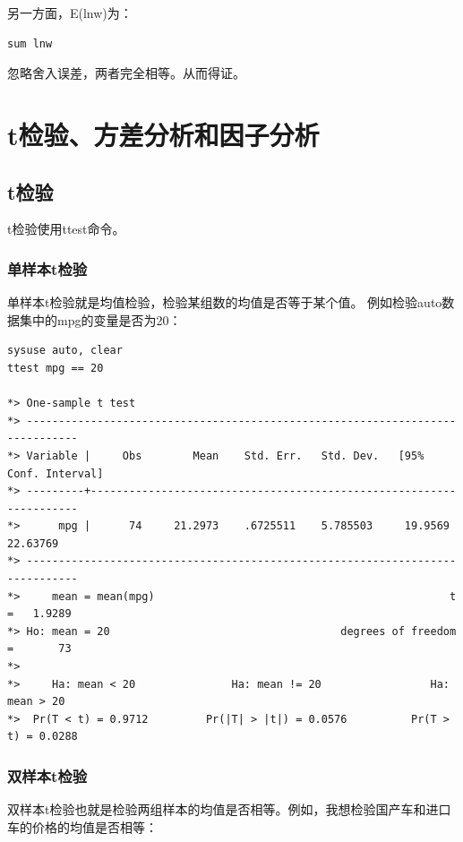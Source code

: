 \documentclass[]{ctexbook}
\begin{document}
另一方面，E(lnw)为：

\begin{lstlisting}
sum lnw
\end{lstlisting}

忽略舍入误差，两者完全相等。从而得证。

\hypertarget{t}{%
\section{t检验、方差分析和因子分析}\label{t}}

\hypertarget{t-1}{%
\subsection{t检验}\label{t-1}}

t检验使用ttest命令。

\hypertarget{t-2}{%
\subsubsection{单样本t检验}\label{t-2}}

单样本t检验就是均值检验，检验某组数的均值是否等于某个值。
例如检验auto数据集中的mpg的变量是否为20：

\begin{lstlisting}
sysuse auto, clear
ttest mpg == 20  

*> One-sample t test
*> ------------------------------------------------------------------------------
*> Variable |     Obs        Mean    Std. Err.   Std. Dev.   [95% Conf. Interval]
*> ---------+--------------------------------------------------------------------
*>      mpg |      74     21.2973    .6725511    5.785503     19.9569    22.63769
*> ------------------------------------------------------------------------------
*>     mean = mean(mpg)                                              t =   1.9289
*> Ho: mean = 20                                    degrees of freedom =       73
*> 
*>     Ha: mean < 20               Ha: mean != 20                 Ha: mean > 20
*>  Pr(T < t) = 0.9712         Pr(|T| > |t|) = 0.0576          Pr(T > t) = 0.0288
\end{lstlisting}

\hypertarget{t-3}{%
\subsubsection{双样本t检验}\label{t-3}}

双样本t检验也就是检验两组样本的均值是否相等。例如，我想检验国产车和进口车的价格的均值是否相等：
\end{document}
